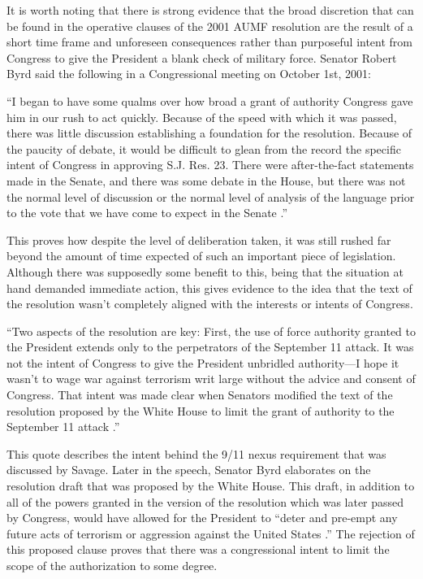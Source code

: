 \documentclass[12pt]{article}
\begin{document}
It is worth noting that there is strong evidence that the broad discretion that can be found in the operative clauses of the 2001 AUMF resolution are the result of a short time frame and unforeseen consequences rather than purposeful intent from Congress to give the President a blank check of military force.
Senator Robert Byrd said the following in a Congressional meeting on October 1st, 2001:

\begin{displayquote}
``I began to have some qualms over how broad a grant of authority Congress
gave him in our rush to act quickly.
Because of the speed with which it was passed, there was little discussion establishing a foundation for the resolution.
Because of the paucity of debate, it would be difficult to glean from the
record the specific intent of Congress in approving S.J. Res. 23.
There were after-the-fact statements made in the Senate, and there was some debate in the House, but there was not the normal level of discussion or the normal
level of analysis of the language prior to the vote that we have come to expect in the Senate \autocite[S9949]{byrd2001a}.''
\end{displayquote}

\noindent
This proves how despite the level of deliberation taken, it was still rushed far beyond the amount of time expected of such an important piece of legislation.
Although there was supposedly some benefit to this, being that the situation at hand demanded immediate action, this gives evidence to the idea that the text of the resolution wasn't completely aligned with the interests or intents of Congress.

\begin{displayquote}
``Two aspects of the resolution are key: First, the use of force authority granted to the President extends only to the perpetrators of the September 11 attack.
It was not the intent of Congress to give the President unbridled authority—I hope it wasn’t to wage war against terrorism writ large without the advice and consent of Congress.
That intent was made clear when Senators modified the text of the resolution proposed by the White House to limit the grant of authority to the September 11 attack \autocite[S9949]{byrd2001a}.''
\end{displayquote}

\noindent
This quote describes the intent behind the 9/11 nexus requirement that was discussed by Savage.
Later in the speech, Senator Byrd elaborates on the resolution draft that was proposed by the White House.
This draft, in addition to all of the powers granted in the version of the resolution which was later passed by Congress, would have allowed for the President to ``deter and pre-empt any future acts of terrorism or aggression against the United States \autocite[S9949]{byrd2001a}.''
The rejection of this proposed clause proves that there was a congressional intent to limit the scope of the authorization to some degree.
\end{document}
